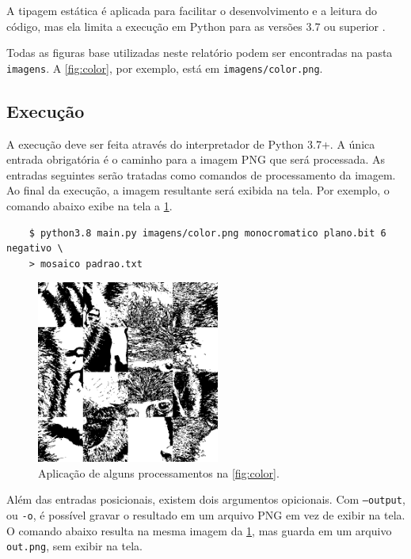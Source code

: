 A tipagem estática é aplicada para facilitar o desenvolvimento e a leitura do código, mas ela limita a execução em Python para as versões 3.7 ou superior \autocite{ref:pep563}.

Todas as figuras base utilizadas neste relatório podem ser encontradas na pasta \texttt{imagens}. A \cref{fig:color}, por exemplo, está em \texttt{imagens/color.png}.

\subsection{Execução}

A execução deve ser feita através do interpretador de Python 3.7+. A única entrada obrigatória é o caminho para a imagem PNG que será processada. As entradas seguintes serão tratadas como comandos de processamento da imagem. Ao final da execução, a imagem resultante será exibida na tela. Por exemplo, o comando abaixo exibe na tela a \cref{fig:execucao}.

\begin{verbatim}
    $ python3.8 main.py imagens/color.png monocromatico plano.bit 6 negativo \
    > mosaico padrao.txt
\end{verbatim}

\begin{figure}[H]
    \centering
    \includegraphics[width=6cm]{resultados/execucao.png}

    \caption{Aplicação de alguns processamentos na \cref{fig:color}.}
    \label{fig:execucao}
\end{figure}

Além das entradas posicionais, existem dois argumentos opicionais. Com \texttt{--output}, ou \texttt{-o}, é possível gravar o resultado em um arquivo PNG em vez de exibir na tela. O comando abaixo resulta na mesma imagem da \cref{fig:execucao}, mas guarda em um arquivo \texttt{out.png}, sem exibir na tela.

